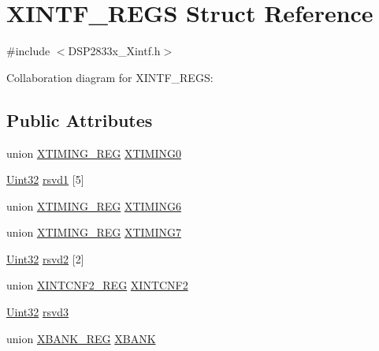 \hypertarget{struct_x_i_n_t_f___r_e_g_s}{}\section{X\+I\+N\+T\+F\+\_\+\+R\+E\+G\+S Struct Reference}
\label{struct_x_i_n_t_f___r_e_g_s}


{\ttfamily \#include $<$D\+S\+P2833x\+\_\+\+Xintf.\+h$>$}



Collaboration diagram for X\+I\+N\+T\+F\+\_\+\+R\+E\+G\+S\+:
\subsection*{Public Attributes}
\begin{DoxyCompactItemize}
\item 
union \hyperlink{union_x_t_i_m_i_n_g___r_e_g}{X\+T\+I\+M\+I\+N\+G\+\_\+\+R\+E\+G} \hyperlink{struct_x_i_n_t_f___r_e_g_s_a261c89f3a3df0059be9cb5597ad2b217}{X\+T\+I\+M\+I\+N\+G0}
\item 
\hyperlink{_d_s_p2833x___device_8h_aba99025e657f892beb7ff31cecf64653}{Uint32} \hyperlink{struct_x_i_n_t_f___r_e_g_s_ad408511b2878bcea4444f2fd04afe736}{rsvd1} \mbox{[}5\mbox{]}
\item 
union \hyperlink{union_x_t_i_m_i_n_g___r_e_g}{X\+T\+I\+M\+I\+N\+G\+\_\+\+R\+E\+G} \hyperlink{struct_x_i_n_t_f___r_e_g_s_a61b20e6b1f46c7f3e9f46a556a770c72}{X\+T\+I\+M\+I\+N\+G6}
\item 
union \hyperlink{union_x_t_i_m_i_n_g___r_e_g}{X\+T\+I\+M\+I\+N\+G\+\_\+\+R\+E\+G} \hyperlink{struct_x_i_n_t_f___r_e_g_s_a69e67c437ce8b32823659b4208954b36}{X\+T\+I\+M\+I\+N\+G7}
\item 
\hyperlink{_d_s_p2833x___device_8h_aba99025e657f892beb7ff31cecf64653}{Uint32} \hyperlink{struct_x_i_n_t_f___r_e_g_s_ab63d62cacb96c44ba73e03a176c5f42c}{rsvd2} \mbox{[}2\mbox{]}
\item 
union \hyperlink{union_x_i_n_t_c_n_f2___r_e_g}{X\+I\+N\+T\+C\+N\+F2\+\_\+\+R\+E\+G} \hyperlink{struct_x_i_n_t_f___r_e_g_s_afadbe18633332d1ad3eda9a2c25512a1}{X\+I\+N\+T\+C\+N\+F2}
\item 
\hyperlink{_d_s_p2833x___device_8h_aba99025e657f892beb7ff31cecf64653}{Uint32} \hyperlink{struct_x_i_n_t_f___r_e_g_s_ac95b0b29961cac47cc52086232501ebf}{rsvd3}
\item 
union \hyperlink{union_x_b_a_n_k___r_e_g}{X\+B\+A\+N\+K\+\_\+\+R\+E\+G} \hyperlink{struct_x_i_n_t_f___r_e_g_s_a518593af5f9bfcd05a2fedf6f046a32d}{X\+B\+A\+N\+K}

\end{DoxyCompactItemize}
